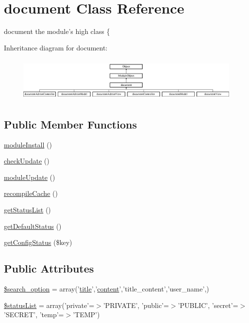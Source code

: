 \hypertarget{classdocument}{\section{document Class Reference}
\label{classdocument}
}


document the module's high class \{  


Inheritance diagram for document\+:\begin{figure}[H]
\begin{center}
\leavevmode
\includegraphics[height=2.262626cm]{classdocument}
\end{center}
\end{figure}
\subsection*{Public Member Functions}
\begin{DoxyCompactItemize}
\item 
\hyperlink{classdocument_a712db6c7542d0ec2cfdde35583a3b7ba}{module\+Install} ()
\item 
\hyperlink{classdocument_a71d01592758989490b56cbd6a2a92e37}{check\+Update} ()
\item 
\hyperlink{classdocument_ad0568fe26b80e3bc328a3fae4997354c}{module\+Update} ()
\item 
\hyperlink{classdocument_ae08854265fa7f6cb8b792d5c1ab93dc2}{recompile\+Cache} ()
\item 
\hyperlink{classdocument_ae90cc64e28afdfa204844ed6d03b40e7}{get\+Status\+List} ()
\item 
\hyperlink{classdocument_aacc6b168cae9bf79d7a13d6f5bb4fdfb}{get\+Default\+Status} ()
\item 
\hyperlink{classdocument_a319eeb35de3ffef5cb32374283b7bf14}{get\+Config\+Status} (\$key)
\end{DoxyCompactItemize}
\subsection*{Public Attributes}
\begin{DoxyCompactItemize}
\item 
\hyperlink{classdocument_adfef00d8f028ef4dfe991de199009d46}{\$search\+\_\+option} = array('\hyperlink{ko_8install_8php_a5b072c5fd1d2228c6ba5cee13cd142e3}{title}','\hyperlink{classcontent}{content}','title\+\_\+content','user\+\_\+name',)
\item 
\hyperlink{classdocument_a93e1c85a4ec17a1471b874fdb14cce58}{\$status\+List} = array('private'=$>$'P\+R\+I\+V\+A\+T\+E', 'public'=$>$'P\+U\+B\+L\+I\+C', 'secret'=$>$'S\+E\+C\+R\+E\+T', 'temp'=$>$'T\+E\+M\+P')
\end{DoxyCompactItemize}


